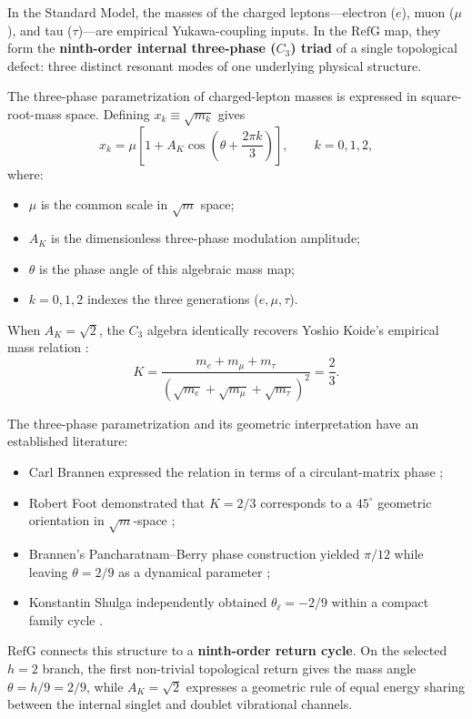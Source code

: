 \documentclass[11pt,a4paper]{article}
\newcommand{\RefG}{\mathrm{RefG}}
\begin{document}
In the Standard Model, the masses of the charged leptons---electron ($e$), muon ($\mu$), and tau ($\tau$)---are empirical Yukawa-coupling inputs. In the $\RefG$ map, they form the \textbf{ninth-order internal three-phase ($C_3$) triad} of a single topological defect: three distinct resonant modes of one underlying physical structure.

The three-phase parametrization of charged-lepton masses is expressed in square-root-mass space. Defining $x_k\equiv\sqrt{m_k}$ gives
\begin{equation}
x_k = \mu \left[1 + A_K \cos\left(\theta + \frac{2\pi k}{3}\right)\right], \qquad k = 0, 1, 2,
\end{equation}
where:
\begin{itemize}
\item $\mu$ is the common scale in $\sqrt{m}$ space;
\item $A_K$ is the dimensionless three-phase modulation amplitude;
\item $\theta$ is the phase angle of this algebraic mass map;
\item $k = 0, 1, 2$ indexes the three generations ($e, \mu, \tau$).
\end{itemize}

When $A_K = \sqrt{2}$, the $C_3$ algebra identically recovers Yoshio Koide's empirical mass relation \citep{koide1982,koide1983}:
\begin{equation}
K = \frac{m_e + m_\mu + m_\tau}{\left(\sqrt{m_e} + \sqrt{m_\mu} + \sqrt{m_\tau}\right)^2} = \frac{2}{3}.
\end{equation}

The three-phase parametrization and its geometric interpretation have an established literature:
\begin{itemize}
\item Carl Brannen expressed the relation in terms of a circulant-matrix phase \citep{brannen2006};
\item Robert Foot demonstrated that $K = 2/3$ corresponds to a $45^\circ$ geometric orientation in $\sqrt{m}$-space \citep{foot1994};
\item Brannen's Pancharatnam--Berry phase construction yielded $\pi/12$ while leaving $\theta = 2/9$ as a dynamical parameter \citep{brannen2010};
\item Konstantin Shulga independently obtained $\theta_\ell = -2/9$ within a compact family cycle \citep{shulga2026}.
\end{itemize}

$\RefG$ connects this structure to a \textbf{ninth-order return cycle}. On the selected $h=2$ branch, the first non-trivial topological return gives the mass angle $\theta=h/9=2/9$, while $A_K=\sqrt2$ expresses a geometric rule of equal energy sharing between the internal singlet and doublet vibrational channels.
\end{document}
